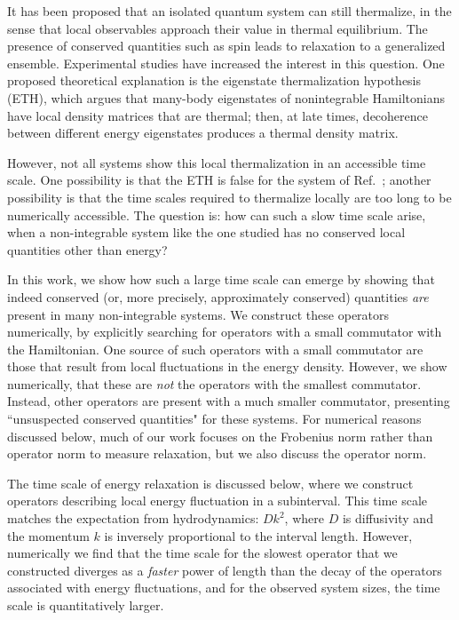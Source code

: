 \documentclass[twocolumn,superscriptaddress, prb]{revtex4-1}
\begin{document}
It has been proposed that an isolated quantum system can still thermalize, in the sense that local observables approach their value in thermal  equilibrium\cite{Deutsch:1991,Srednicki:1994,Rigol:2008}.  The presence of conserved quantities such as spin leads to relaxation to a generalized ensemble.  Experimental studies have increased the interest in this question\cite{Polkovnikov:2011, Yukalov:2011}.  One proposed theoretical explanation is the eigenstate thermalization hypothesis (ETH)\cite{Deutsch:1991,Srednicki:1994,Rigol:2008,Santos:2010,Rigol:2012,Kruczenski:2013,Beugeling:2014,Sorg:2014,Kim_ETH,Goldstein:2014}, which argues that many-body eigenstates of nonintegrable Hamiltonians have local density matrices that are thermal; then, at late times, decoherence between different energy eigenstates produces a thermal density matrix.

However, not all systems show this local thermalization in an accessible time scale\cite{Banuls:2011}.
One possibility is that the ETH is false for the system of Ref.~; another possibility is that the time scales required to thermalize locally are too long to be numerically accessible.  The question is: how can such a slow time scale arise, when a non-integrable system like the one studied has no conserved local quantities other than energy?

In this work, we show how such a large time scale can emerge by showing that indeed conserved (or, more precisely, approximately conserved) quantities {\it are} present in many non-integrable systems.  We construct these operators numerically, by explicitly searching for operators with a small commutator with the Hamiltonian.  One source of such operators with a small commutator are those that result from local fluctuations in the energy density.  However, we show numerically, that these are {\it not} the operators with the smallest commutator.  Instead, other operators are present with a much smaller commutator, presenting ``unsuspected conserved quantities" for these systems.  For numerical reasons discussed below, much of our work focuses on the Frobenius norm rather than operator norm to measure relaxation, but we also discuss the operator norm.


The time scale of energy relaxation is discussed below, where we construct operators describing local energy fluctuation in a subinterval.  This time scale matches the expectation
 from hydrodynamics:
$D k^2$, where $D$ is diffusivity and the momentum $k$ is inversely proportional to the interval length.
However, numerically we find that the time scale for the slowest operator that we constructed diverges as a {\it faster} power of length than the decay of the operators associated with energy fluctuations, and for the observed system sizes, the time scale is quantitatively larger.
\end{document}
